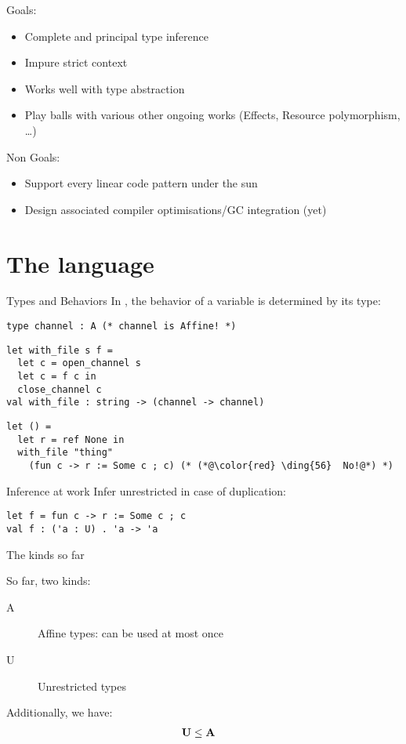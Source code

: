 \documentclass[xcolor=svgnames,11pt]{beamer}
\begin{document}
\begin{frame}
  Goals:
  \begin{itemize}
  \item Complete and principal type inference
  \item Impure strict context
  \item Works well with type abstraction
  \item Play balls with various other ongoing works (Effects, Resource polymorphism, \dots)
  \end{itemize}

  \pause
  Non Goals:
  \begin{itemize}
  \item Support every linear code pattern under the sun
  \item Design associated compiler optimisations/GC integration (yet)
  \end{itemize}
\end{frame}


\section{The \lang language}

\begin{frame}[fragile]{Types and Behaviors}
  In \lang, the behavior of a variable is determined
  by its type:
\begin{lstlisting}
type channel : A (* channel is Affine! *)
\end{lstlisting}\pause
\begin{lstlisting}
let with_file s f = 
  let c = open_channel s
  let c = f c in
  close_channel c
val with_file : string -> (channel -> channel)
\end{lstlisting}\pause
\begin{lstlisting}
let () = 
  let r = ref None in
  with_file "thing"
    (fun c -> r := Some c ; c) (* (*@\color{red} \ding{56}  No!@*) *)
\end{lstlisting}
\end{frame}

\begin{frame}[fragile]{Inference at work}
  Infer unrestricted in case of duplication:
\begin{lstlisting}
let f = fun c -> r := Some c ; c
val f : ('a : U) . 'a -> 'a
\end{lstlisting}
\end{frame}

\begin{frame}{The kinds so far}

  So far, two kinds:
  \begin{description}
  \item[A] Affine types: can be used at most once
  \item[U] Unrestricted types
  \end{description}

  Additionally, we have:
  \begin{align*}
    \mathbf{U} &\leq \mathbf{A}
  \end{align*}
\end{frame}
\end{document}
